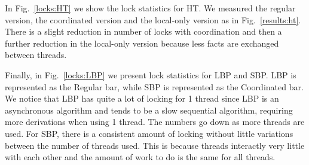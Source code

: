 In Fig.~\ref{locks:HT} we show the lock statistics for HT. We measured the
regular version, the coordinated version and the local-only version as in
Fig.~\ref{results:ht}. There is a slight reduction in number of locks with
coordination and then a further reduction in the local-only version because less
facts are exchanged between threads.

\begin{topfig}
   \begin{center}
   \end{center}
\end{topfig}

Finally, in Fig.~\ref{locks:LBP} we present lock statistics for LBP and SBP. LBP
is represented as the Regular bar, while SBP is represented as the Coordinated
bar. We notice that LBP has quite a lot of locking for 1 thread since LBP
is an asynchronous algorithm and tends to be a slow sequential algorithm,
requiring more derivations when using 1 thread. The numbers go down as more
threads are used. For SBP, there is a consistent amount of locking without
little variations between the number of threads used. This is because threads
interactly very little with each other and the amount of work to do is the same
for all threads.

\begin{topfig}
   \begin{center}
   \end{center}
\end{topfig}

